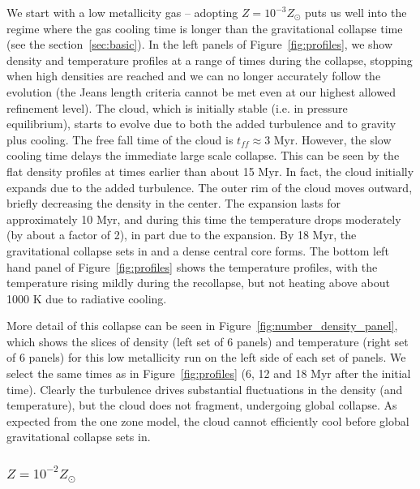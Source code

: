 \documentclass[useAMS,usenatbib]{mn2e}
\begin{document}
We start with a low metallicity gas -- adopting $Z=10^{-3}Z_\odot$ puts us well into the regime
where the gas cooling time is longer than the gravitational collapse time (see the section~\ref{sec:basic}).
In the left panels of Figure~\ref{fig:profiles}, we show density and temperature profiles at a range of times during
the collapse, stopping when high densities are reached and we can no longer accurately follow the evolution
(the Jeans length criteria cannot be met even at our highest allowed refinement level).  
The cloud, which is initially stable (i.e. in pressure equilibrium), starts to evolve due to both the added
turbulence and to gravity plus cooling. The free fall time of the cloud is $t_{ff}\approx 3$ Myr.
However, the slow cooling time delays the immediate large scale collapse.
This can be seen by the flat density profiles at times earlier than about 15 Myr. 
In fact, the cloud initially expands due to the added turbulence. The outer rim
of the cloud moves outward, briefly decreasing the density in the center.
The expansion lasts for approximately 10 Myr, and during this time the temperature drops moderately
(by about a factor of 2), in part due to the expansion.  By 18 Myr, the gravitational
collapse sets in and a dense central core forms.   The bottom left hand panel of Figure~\ref{fig:profiles}
shows the temperature profiles, with the temperature rising mildly during the recollapse, but
not heating above about 1000 K due to radiative cooling.

More detail of this collapse can be seen in Figure~\ref{fig:number_density_panel}, which shows the slices of density (left set of 6 panels) and temperature (right set of 6 panels) for this low metallicity run on the left side of each set of panels.  We select the same times as in Figure~\ref{fig:profiles} (6, 12 and 18 Myr after the initial time).  Clearly the turbulence drives substantial fluctuations in the density (and temperature), but the cloud does not fragment, undergoing global collapse.   As expected from the one zone model, the cloud cannot efficiently cool before global gravitational collapse sets in.


\subsubsection{$Z=10^{-2}Z_\odot$}
\end{document}
